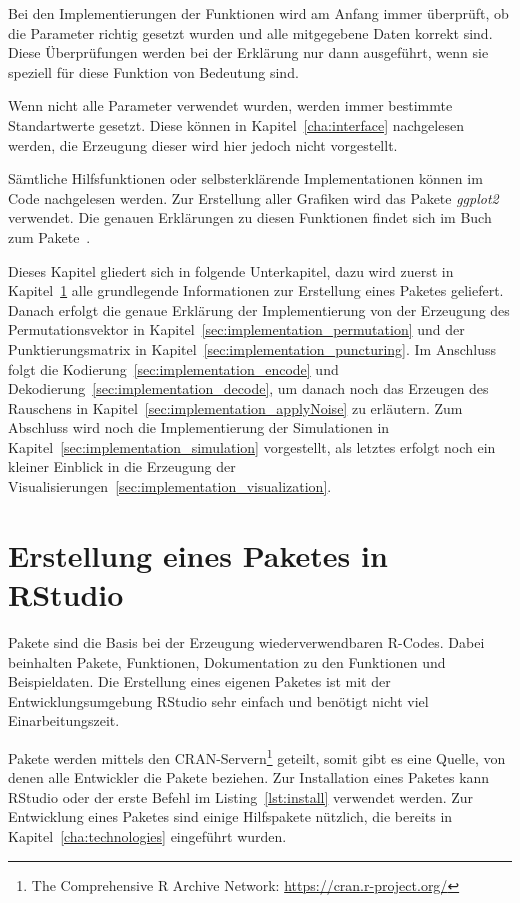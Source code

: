 Bei den Implementierungen der Funktionen wird am Anfang immer überprüft, ob die Parameter richtig gesetzt wurden und alle mitgegebene Daten korrekt sind. Diese Überprüfungen werden bei der Erklärung nur dann ausgeführt, wenn sie speziell für diese Funktion von Bedeutung sind. 

Wenn nicht alle Parameter verwendet wurden, werden immer bestimmte Standartwerte gesetzt. Diese können in Kapitel~\ref{cha:interface} nachgelesen werden, die Erzeugung dieser wird hier jedoch nicht vorgestellt.

Sämtliche Hilfsfunktionen oder selbsterklärende Implementationen können im Code nachgelesen werden. Zur Erstellung aller Grafiken wird das Pakete \emph{ggplot2} verwendet. Die genauen Erklärungen zu diesen Funktionen findet sich im Buch zum Pakete~\cite{ggplot2}.

Dieses Kapitel gliedert sich in folgende Unterkapitel, dazu wird zuerst in Kapitel~\ref{sec:implementation_package} alle grundlegende Informationen zur Erstellung eines Paketes geliefert. Danach erfolgt die genaue Erklärung der Implementierung von der Erzeugung des Permutationsvektor in Kapitel~\ref{sec:implementation_permutation} und der Punktierungsmatrix in Kapitel~\ref{sec:implementation_puncturing}. Im Anschluss folgt die Kodierung~\ref{sec:implementation_encode} und Dekodierung~\ref{sec:implementation_decode}, um danach noch das Erzeugen des Rauschens in Kapitel~\ref{sec:implementation_applyNoise} zu erläutern. Zum Abschluss wird noch die Implementierung der Simulationen in Kapitel~\ref{sec:implementation_simulation} vorgestellt, als letztes erfolgt noch ein kleiner Einblick in die Erzeugung der Visualisierungen~\ref{sec:implementation_visualization}.

\section{Erstellung eines Paketes in RStudio}
\label{sec:implementation_package}
Pakete sind die Basis bei der Erzeugung wiederverwendbaren R-Codes. Dabei beinhalten Pakete, Funktionen, Dokumentation zu den Funktionen und Beispieldaten. Die Erstellung eines eigenen Paketes ist mit der Entwicklungsumgebung RStudio sehr einfach und benötigt nicht viel Einarbeitungszeit.

Pakete werden mittels den CRAN-Servern\footnote{The Comprehensive R Archive Network: \url{https://cran.r-project.org/}} geteilt, somit gibt es eine Quelle, von denen alle Entwickler die Pakete beziehen. Zur Installation eines Paketes kann RStudio oder der erste Befehl im Listing~\ref{lst:install} verwendet werden. Zur Entwicklung eines Paketes sind einige Hilfspakete nützlich, die bereits in Kapitel~\ref{cha:technologies} eingeführt wurden. 

